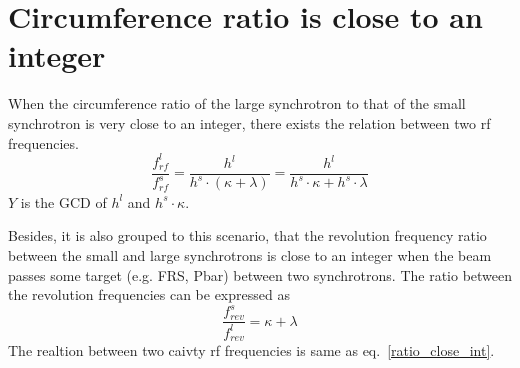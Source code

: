 \section{Circumference ratio is close to an integer}
\label{sec:close_to_int}
When the circumference ratio of the large synchrotron to that of the small synchrotron is very close to an integer, there exists the relation between two rf frequencies. 
\begin{equation} 
\label{ratio_close_int}
\frac{f_{\mathit{rf}}^{l}}{f_{\mathit{rf}}^{s}}=\frac{h^l}{h^s \cdot ( \kappa+ \lambda)}=\frac{h^l}{h^s \cdot  \kappa+ h^s \cdot \lambda}
\end{equation}
$Y$ is the GCD of $h^l$ and $h^s \cdot \kappa$.



Besides, it is also grouped to this scenario, that the revolution frequency ratio between the small and large synchrotrons is close to an integer when the beam passes some target (e.g. FRS, Pbar) between two synchrotrons. The ratio between the revolution frequencies can be expressed as
\begin{equation} 
\frac{f_{\mathit{rev}}^{s}}{f_{\mathit{rev}}^{l}}=\kappa+ \lambda\label{close_to_interger1}
\end{equation}
The realtion between two caivty rf frequencies is same as eq.~\ref{ratio_close_int}.

